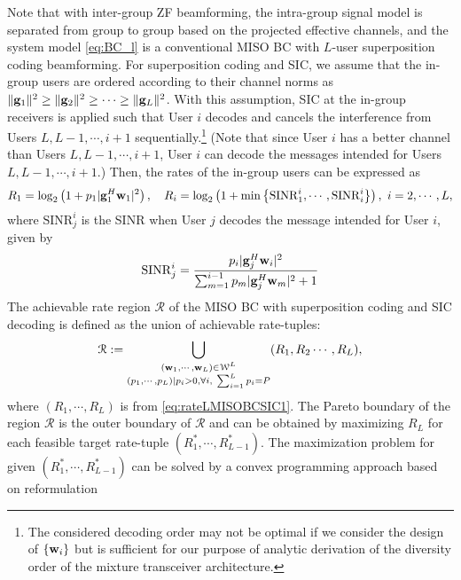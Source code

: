 \documentclass[11pt, draft, onecolumn ]{IEEEtran}
\begin{document}
Note that with inter-group ZF beamforming, the intra-group signal model is separated from group to group based on the projected effective channels, and the system model  \eqref{eq:BC_l} is a conventional  MISO BC with $L$-user superposition coding beamforming.
For superposition coding and SIC,
we assume that the in-group users are ordered according to their channel norms as
$\|{\bf g}_1\|^2 \geq \|{\bf g}_2\|^2 \geq \cdots  \geq \|{\bf g}_L\|^2$.
With this assumption, SIC at the in-group receivers is applied such that
User $i$ decodes and cancels the interference from Users $L, L-1, \cdots, i+1$ sequentially.\footnote{{}{The considered decoding order may not be optimal if we consider the  design of $\{{\bf w}_i\}$ but is sufficient for our purpose of analytic derivation of the diversity order of the mixture transceiver architecture.}} (Note that since User $i$ has a better channel than Users $L,L-1,\cdots,i+1$, User $i$ can decode the messages intended for Users
$L,L-1,\cdots,i+1$.)
 Then, the rates of the in-group users can be expressed  as
\begin{equation} \label{eq:rateLMISOBCSIC1}  %
    R_1 =  \log_2 \left( 1 + p_1|\gbf_1^H \wbf_1|^2\right), ~~~
    R_i =  \log_2 \left( 1 +  \min \left\{ \mathrm{SINR}_1^i, \cdots, \mathrm{SINR}_i^i \right\}\right), ~ i = 2, \cdots, L,
\end{equation}
where $\mathrm{SINR}_j^i$ is the SINR  when User $j$ decodes the message intended for User $i$, given by
\begin{equation}
    \mathrm{SINR}_j^i = \frac{p_i|{\bf g}_j^H {\bf w}_i|^2}{\sum_{m=1}^{i-1} p_{m}|{\bf g}_j^H {\bf w}_{m}|^2 + 1}
\end{equation}
The achievable rate region $\mathcal{R}$ of the
MISO BC with superposition coding and SIC decoding is defined as the union of achievable rate-tuples:
\begin{equation}  \label{eq:AchieRegionMISOBCSIC}
    \mathcal{R} := \bigcup\limits_{ \substack{({\bf w}_1, \cdots, {\bf w}_L) \in \mathcal{W}^L \\ (p_1, \cdots, p_L) | p_i >0, \forall i,~\sum_{i=1}^L p_i = P  } } ( R_1, R_2 \cdots, R_L ),
\end{equation}
where $(R_1,\cdots,R_L)$ is  from \eqref{eq:rateLMISOBCSIC1}. %
The Pareto boundary of the region $\mathcal{R}$ is the outer boundary of $\mathcal{R}$ and  can be obtained
by maximizing $R_L$ for each feasible target rate-tuple $(R_1^* , \cdots, R_{L-1}^*)$.
The maximization problem  for given $(R_1^* , \cdots, R_{L-1}^*)$  can be solved  by a convex programming approach based on reformulation \cite{Hanif16:TSP}
\end{document}
